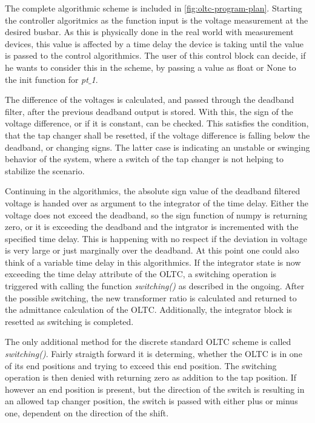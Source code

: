 The complete algorithmic scheme is included in \autoref{fig:oltc-program-plan}.
Starting the controller algoritmics as the function input is the voltage measurement at the desired busbar.
As this is physically done in the real world with measurement devices, this value is affected by a time delay the device is taking until the value is passed to the control algorithmics.
The user of this control block can decide, if he wants to consider this in the scheme, by passing a value as float or None to the init function for \textit{pt$\_$1}.

The difference of the voltages is calculated, and passed through the deadband filter, after the previous deadband output is stored.
With this, the sign of the voltage difference, or if it is constant, can be checked.
This satisfies the condition, that the tap changer shall be resetted, if the voltage difference is falling below the deadband, or changing signs.
The latter case is indicating an unstable or swinging behavior of the system, where a switch of the tap changer is not helping to stabilize the scenario.

Continuing in the algorithmics, the absolute sign value of the deadband filtered voltage is handed over as argument to the integrator of the time delay.
Either the voltage does not exceed the deadband, so the sign function of numpy is returning zero, or it is exceeding the deadband and the intgrator is incremented with the specified time delay. 
This is happening with no respect if the deviation in voltage is very large or just marginally over the deadband.
At this point one could also think of a variable time delay in this algorithmics.
If the integrator state is now exceeding the time delay attribute of the \acs{OLTC}, a switching operation is triggered with calling the function \textit{switching()} as described in the ongoing.
After the possible switching, the new transformer ratio is calculated and returned to the admittance calculation of the \acs{OLTC}.
Additionally, the integrator block is resetted as switching is completed.

The only additional method for the discrete standard \acs{OLTC} scheme is called \textit{switching()}.
Fairly straigth forward it is determing, whether the \acs{OLTC} is in one of its end positions and trying to exceed this end position.
The switching operation is then denied with returning zero as addition to the tap position.
If however an end position is present, but the direction of the switch is resulting in an allowed tap changer position, the switch is passed with either plus or minus one, dependent on the direction of the shift.

